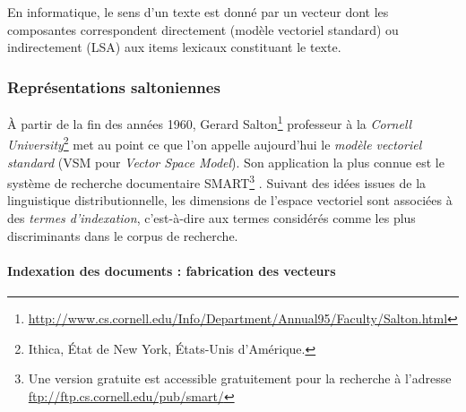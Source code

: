En informatique, le
sens d'un texte est donné par un vecteur dont les composantes
correspondent directement (modèle vectoriel standard) ou indirectement
(LSA) aux items lexicaux constituant le texte.

\subsubsection{Représentations saltoniennes} \label{sec:repr-salt}

À partir de la fin des années 1960, Gerard
Salton\footnote{\url{http://www.cs.cornell.edu/Info/Department/Annual95/Faculty/Salton.html}}
professeur à la \emph{Cornell University}\footnote{Ithica, \'Etat de
  New York, \'Etats-Unis d'Amérique.}  met au point ce que l'on
appelle aujourd'hui le \emph{modèle vectoriel standard} (VSM pour
\emph{Vector Space Model}). Son application la plus connue est le
système de recherche documentaire SMART\footnote{Une version gratuite
  est accessible gratuitement pour la recherche à l'adresse
  \url{ftp://ftp.cs.cornell.edu/pub/smart/}} \cite{Smart1971,
  SalMac1983, Smart1991}. Suivant des idées issues de la linguistique
distributionnelle, les dimensions de l'espace vectoriel sont associées
à des \emph{termes d'indexation}, c'est-à-dire aux termes considérés
comme les plus discriminants dans le corpus de recherche.

\paragraph{Indexation des documents : fabrication des vecteurs}

